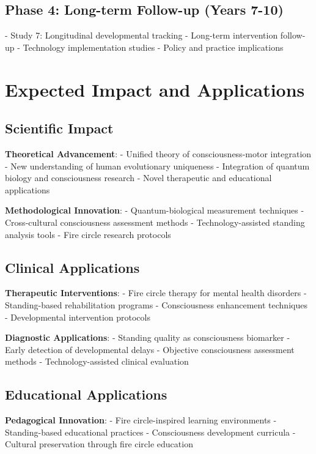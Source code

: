 \documentclass[12pt]{article}
\begin{document}
\subsection{Phase 4: Long-term Follow-up (Years 7-10)}
- Study 7: Longitudinal developmental tracking
- Long-term intervention follow-up
- Technology implementation studies
- Policy and practice implications

\section{Expected Impact and Applications}

\subsection{Scientific Impact}

\textbf{Theoretical Advancement}:
- Unified theory of consciousness-motor integration
- New understanding of human evolutionary uniqueness
- Integration of quantum biology and consciousness research
- Novel therapeutic and educational applications

\textbf{Methodological Innovation}:
- Quantum-biological measurement techniques
- Cross-cultural consciousness assessment methods
- Technology-assisted standing analysis tools
- Fire circle research protocols

\subsection{Clinical Applications}

\textbf{Therapeutic Interventions}:
- Fire circle therapy for mental health disorders
- Standing-based rehabilitation programs
- Consciousness enhancement techniques
- Developmental intervention protocols

\textbf{Diagnostic Applications}:
- Standing quality as consciousness biomarker
- Early detection of developmental delays
- Objective consciousness assessment methods
- Technology-assisted clinical evaluation

\subsection{Educational Applications}

\textbf{Pedagogical Innovation}:
- Fire circle-inspired learning environments
- Standing-based educational practices
- Consciousness development curricula
- Cultural preservation through fire circle education
\end{document}
